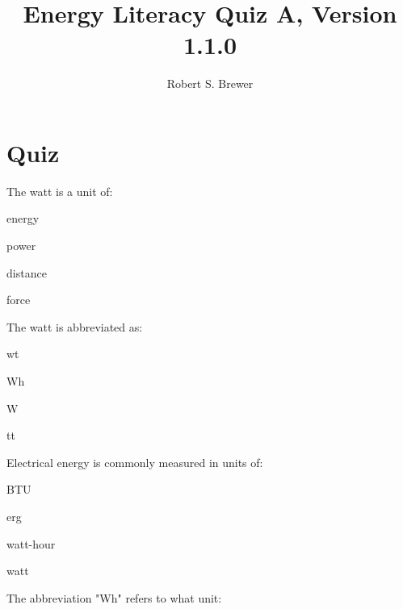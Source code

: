 \documentclass[11pt]{article}
\begin{document}
\title{Energy Literacy Quiz A, Version 1.1.0}
\author{Robert S. Brewer}

\maketitle


\section{Quiz}

\begin{question}
	\item The watt is a unit of:
\end{question}

\begin{answer}
	\item energy
	\item power
	\item distance
	\item force
\end{answer}

\begin{question}
	\item The watt is abbreviated as:
\end{question}

\begin{answer}
	\item wt
	\item Wh
	\item W
	\item tt
\end{answer}

\begin{question}
	\item Electrical energy is commonly measured in units of:
\end{question}

\begin{answer}
	\item BTU
	\item erg
	\item watt-hour
	\item watt
\end{answer}

\begin{question}
	\item The abbreviation "Wh" refers to what unit:
\end{question}
\end{document}
